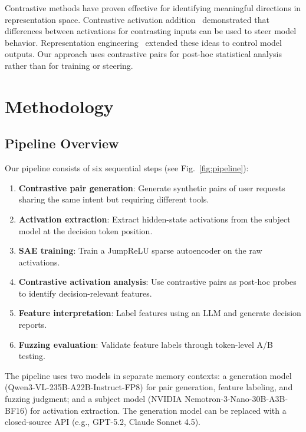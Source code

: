 \documentclass[runningheads]{llncs}
\begin{document}
Contrastive methods have proven effective for identifying meaningful directions in representation space. Contrastive activation addition~\cite{turner2024steeringlanguagemodelsactivation} demonstrated that differences between activations for contrasting inputs can be used to steer model behavior. Representation engineering~\cite{zou2025representationengineeringtopdownapproach} extended these ideas to control model outputs. Our approach uses contrastive pairs for post-hoc statistical analysis rather than for training or steering.


\section{Methodology}
\label{sec:methodology}

\subsection{Pipeline Overview}

Our pipeline consists of six sequential steps (see Fig.~\ref{fig:pipeline}):

\begin{enumerate}
\item \textbf{Contrastive pair generation}: Generate synthetic pairs of user requests sharing the same intent but requiring different tools.
\item \textbf{Activation extraction}: Extract hidden-state activations from the subject model at the decision token position.
\item \textbf{SAE training}: Train a JumpReLU sparse autoencoder on the raw activations.
\item \textbf{Contrastive activation analysis}: Use contrastive pairs as post-hoc probes to identify decision-relevant features.
\item \textbf{Feature interpretation}: Label features using an LLM and generate decision reports.
\item \textbf{Fuzzing evaluation}: Validate feature labels through token-level A/B testing.
\end{enumerate}

The pipeline uses two models in separate memory contexts: a generation model (Qwen3-VL-235B-A22B-Instruct-FP8) for pair generation, feature labeling, and fuzzing judgment; and a subject model (NVIDIA Nemotron-3-Nano-30B-A3B-BF16) for activation extraction. The generation model can be replaced with a closed-source API (e.g., GPT-5.2, Claude Sonnet 4.5).
\end{document}
